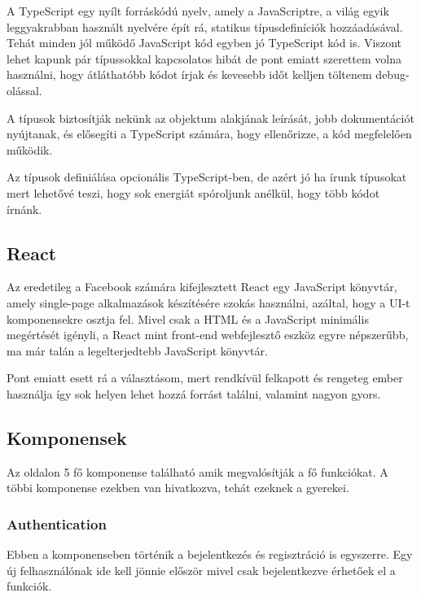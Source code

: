 A TypeScript egy nyílt forráskódú nyelv, amely a JavaScriptre, a világ egyik leggyakrabban használt nyelvére épít rá, statikus típusdefiníciók hozzáadásával. Tehát minden jól működő JavaScript kód egyben jó TypeScript kód is. Viszont lehet kapunk pár típussokkal kapcsolatos hibát de pont emiatt szerettem volna használni, hogy átláthatóbb kódot írjak és kevesebb időt kelljen töltenem debug-olással. \bigskip

A típusok biztosítják nekünk az objektum alakjának leírását, jobb dokumentációt nyújtanak, és elősegíti a TypeScript számára, hogy ellenőrizze, a kód megfelelően működik.\bigskip

Az típusok definiálása opcionális TypeScript-ben, de azért jó ha írunk típusokat mert lehetővé teszi, hogy sok energiát spóroljunk anélkül, hogy több kódot írnánk.

\subsection{React}

Az eredetileg a Facebook számára kifejlesztett React egy JavaScript könyvtár, amely single-page alkalmazások készítésére szokás használni, azáltal, hogy a UI-t komponensekre osztja fel. Mivel csak a HTML és a JavaScript  minimális megértését igényli, a React mint front-end webfejlesztő eszköz egyre népszerűbb, ma már talán a legelterjedtebb JavaScript könyvtár. \bigskip

Pont emiatt esett rá a választásom, mert rendkívül felkapott és rengeteg ember használja így sok helyen lehet hozzá forrást találni, valamint nagyon gyors.

\subsection{Komponensek}

Az oldalon 5 fő komponense található amik megvalósítják a fő funkciókat. A többi komponense ezekben van hivatkozva, tehát ezeknek a gyerekei.

\subsubsection{Authentication}

Ebben a komponenseben történik a bejelentkezés és regisztráció is egyszerre. Egy új felhasználónak ide kell jönnie először mivel csak bejelentkezve érhetőek el a funkciók.


